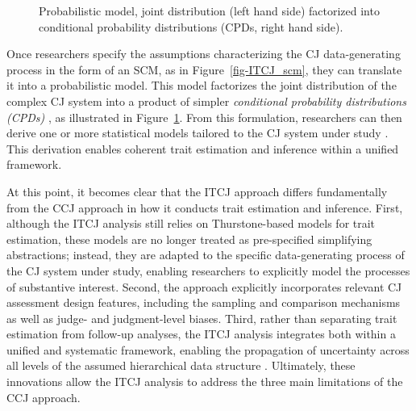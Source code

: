 \documentclass[
  authoryear,
  review,
  1p]{elsarticle}
\begin{document}
\begin{figure}

\centering{

\[
\begin{aligned}
P(O_{R}, D_{R} &, S, C, T_{IA}, X_{IA}, e_{IA}, T_{I}, X_{I}, e_{I}, B_{JK}, Z_{JK}, e_{JK}, B_{J}, Z_{J}, e_{J} ) & \\
  =& \; P( O_{R} \mid D_{R}, S, C ) \cdot P(S) \cdot P(C) \\
  & \cdot P( D_{R} \mid T_{IA}, B_{JK} ) \\
  & \cdot P( T_{IA} \mid T_{I}, X_{IA}, e_{IA} ) \cdot P(X_{IA}) \\
  & \cdot P( T_{I} \mid X_{I}, e_{I} ) \cdot P(X_{I}) \\
  & \cdot P( B_{JK} \mid B_{J}, Z_{JK}, e_{JK} ) \cdot P(Z_{JK}) \\
  & \cdot P( B_{J} \mid Z_{J}, e_{J} ) \cdot P(Z_{J}) \\
  & \cdot P( e_{I} ) P( e_{IA} ) P( e_{J} ) P( e_{JK} )
\end{aligned}
\]

}

\caption{\label{fig-ITCJ_prob}Probabilistic model, joint distribution
(left hand side) factorized into conditional probability distributions
(CPDs, right hand side).}

\end{figure}%

Once researchers specify the assumptions characterizing the CJ
data-generating process in the form of an SCM, as in
Figure~\ref{fig-ITCJ_scm}, they can translate it into a probabilistic
model. This model factorizes the joint distribution of the complex CJ
system into a product of simpler \emph{conditional probability
distributions (CPDs)} \citep{Pearl_et_al_2016, Neal_2020}, as
illustrated in Figure~\ref{fig-ITCJ_prob}. From this formulation,
researchers can then derive one or more statistical models tailored to
the CJ system under study \citep[see][]{Rivera_et_al_2025}. This
derivation enables coherent trait estimation and inference within a
unified framework.

At this point, it becomes clear that the ITCJ approach differs
fundamentally from the CCJ approach in how it conducts trait estimation
and inference. First, although the ITCJ analysis still relies on
Thurstone-based models for trait estimation, these models are no longer
treated as pre-specified simplifying abstractions; instead, they are
adapted to the specific data-generating process of the CJ system under
study, enabling researchers to explicitly model the processes of
substantive interest. Second, the approach explicitly incorporates
relevant CJ assessment design features, including the sampling and
comparison mechanisms as well as judge- and judgment-level biases.
Third, rather than separating trait estimation from follow-up analyses,
the ITCJ analysis integrates both within a unified and systematic
framework, enabling the propagation of uncertainty across all levels of
the assumed hierarchical data structure \citep{Rivera_et_al_2025}.
Ultimately, these innovations allow the ITCJ analysis to address the
three main limitations of the CCJ approach.
\end{document}
